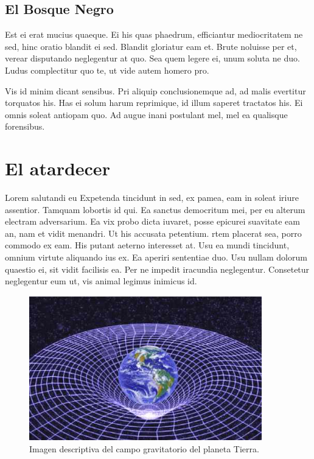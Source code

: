 \documentclass[a4paper, 11pt, titlepage, twocolumn]{book}
\begin{document}
\section{El Bosque Negro}

Est ei erat mucius quaeque. Ei his quas phaedrum, efficiantur mediocritatem ne sed, hinc oratio blandit ei sed. Blandit gloriatur eam et. Brute noluisse per et, verear disputando neglegentur at quo. Sea quem legere ei, unum soluta ne duo. Ludus complectitur quo te, ut vide autem homero pro.

Vis id minim dicant sensibus. Pri aliquip conclusionemque ad, ad malis evertitur torquatos his. Has ei solum harum reprimique, id illum saperet tractatos his. Ei omnis soleat antiopam quo. Ad augue inani postulant mel, mel ea qualisque forensibus.

\chapter{El atardecer}

Lorem salutandi eu 
Expetenda tincidunt in sed, ex pamea, eam in soleat iriure assentior. Tamquam lobortis id qui. Ea sanctus democritum mei, per eu alterum electram adversarium. Ea vix probo dicta iuvaret, posse epicurei suavitate eam an, nam et vidit menandri. Ut his accusata petentium.
rtem placerat sea, porro commodo ex eam. His putant aeterno interesset at. Usu ea mundi tincidunt, omnium virtute aliquando ius ex. Ea aperiri sententiae duo. Usu nullam dolorum quaestio ei, sit vidit facilisis ea. Per ne impedit iracundia neglegentur. Consetetur neglegentur eum ut, vis animal legimus inimicus id.

\begin{figure}[htp]
    \centering
    \includegraphics[width=0.9\textwidth]{imagen.jpeg}
    \caption{Imagen descriptiva del campo gravitatorio del planeta Tierra.}
    \label{}
\end{figure}
\end{document}
